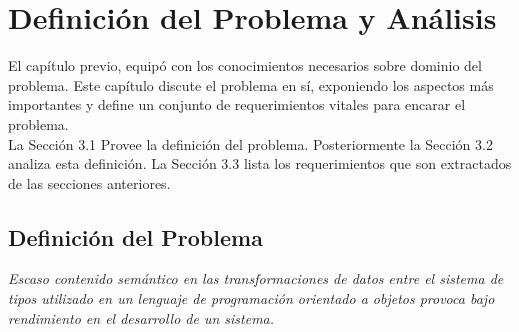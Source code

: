 
\chapter{Definición del Problema y Análisis}
\noindent El capítulo previo, equipó con los conocimientos necesarios sobre dominio del problema.
\noindent Este capítulo discute el problema en sí, exponiendo los aspectos más importantes y define un conjunto
\noindent de requerimientos vitales para encarar el problema.\\
\indent    La Sección 3.1 Provee la definición del problema.
\noindent Posteriormente la Sección 3.2 analiza esta definición. La Sección 3.3 lista los requerimientos
\noindent que son extractados de las secciones anteriores.
\section{Definición del Problema}
\noindent \textit{Escaso contenido semántico en las transformaciones de datos entre el sistema de tipos
                    utilizado en un lenguaje de programación orientado a objetos provoca bajo rendimiento
                    en el desarrollo de un sistema.}

